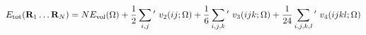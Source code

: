 \documentclass[12pt]{article}
\begin{document}
$$
   E_{\rm tot}({\bf R}_1 \ldots {\bf R}_N) = NE_{\rm vol}(\Omega ) 
   + \frac{1}{2} \sum _{i,j} \mbox{}^\prime \ v_2(ij;\Omega ) 
   + \frac{1}{6} \sum _{i,j,k} \mbox{}^\prime \ v_3(ijk;\Omega ) 
   + \frac{1}{24} \sum _{i,j,k,l} \mbox{}^\prime \ v_4(ijkl;\Omega )
$$
\end{document}
